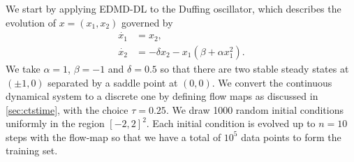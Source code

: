 \documentclass[%
 aip,
 cha,
 sd,%
 amsmath,amssymb,
 preprint,%
]{revtex4-1}
\begin{document}
We start by applying EDMD-DL to the Duffing oscillator, which describes the evolution of $x=(x_1, x_2)$ governed by
\begin{align}
	\dot{x_1} &= x_2, \nonumber \\
	\dot{x_2} &= -\delta x_2 - x_1 (\beta + \alpha x_1^2). 
	\label{eq:duffing}
\end{align}
We take $\alpha=1$, $\beta=-1$ and $\delta=0.5$ so that there are two stable steady states at $(\pm 1, 0)$ separated by a saddle point at $(0,0)$. We convert the continuous dynamical system to a discrete one by defining flow maps as discussed in \ref{sec:ctstime}, with the choice $\tau=0.25$. We draw 1000 random initial conditions uniformly in the region $[-2,2]^2$. Each initial condition is evolved up to $n=10$ steps with the flow-map so that we have a total of $10^5$ data points to form the training set. 
\end{document}
